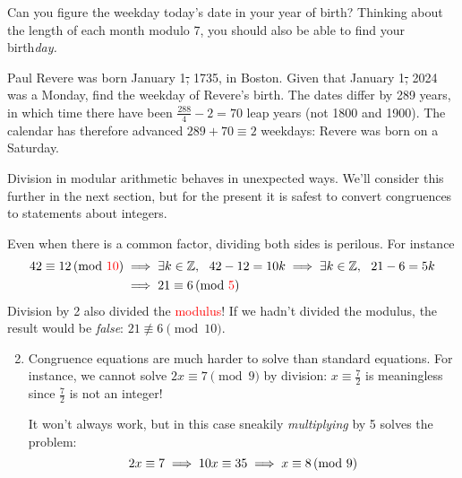 Can you figure the weekday today's date in your year of birth? Thinking about the length of each month modulo 7, you should also be able to find your birth\emph{day.}

\begin{example}{}{}
	Paul Revere was born January 1\st, 1735, in Boston. Given that January 1\st, 2024 was a Monday, find the weekday of Revere's birth.\smallbreak
	The dates differ by 289 years, in which time there have been $\frac{288}4-2=70$ leap years (not 1800 and 1900). The calendar has therefore advanced $289+70\equiv 2$ weekdays: Revere was born on a Saturday.
\end{example}



Division in modular arithmetic behaves in unexpected ways. We'll consider this further in the next section, but for the present it is safest to convert congruences to statements about integers.

\begin{examples}{}{}
	\exstart Even when there is a common factor, dividing both sides is perilous. For instance
	\begin{align*}
		42\equiv 12\negthickspace\pmod{\textcolor{red}{10}}&\implies \exists k\in\mathbb{Z},\ \ 42-12=10k \implies \exists k\in\mathbb{Z},\ \ 21-6=5k\\
		&\implies 21\equiv 6\negthickspace\pmod{\textcolor{red}{5}}
	\end{align*}
	Division by 2 also divided the \textcolor{red}{modulus}! If we hadn't divided the modulus, the result would be \emph{false}: $21\not\equiv 6\pmod{10}$.
			
	\begin{enumerate}\setcounter{enumi}{1}
		\item Congruence equations are much harder to solve than standard equations. For instance, we cannot solve $2x\equiv 7\pmod 9$ by division: $x\equiv \frac 72$ is meaningless since $\frac 72$ is not an integer!\par 		It won't always work, but in this case sneakily \emph{multiplying} by 5 solves the problem:
		\[
			2x\equiv 7\implies 10x\equiv 35\implies x\equiv 8\negthickspace\pmod{9}
		\]
	\end{enumerate}
\end{examples}

